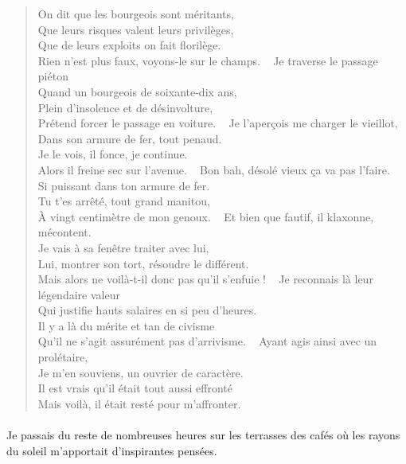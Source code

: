 \begin{verse}
On dit que les bourgeois sont méritants,\\
Que leurs risques valent leurs privilèges,\\
Que de leurs exploits on fait florilège.\\
Rien n’est plus faux, voyons-le sur le champs.
~
Je traverse le passage piéton\\
Quand un bourgeois de soixante-dix ans,\\
Plein d’insolence et de désinvolture,\\
Prétend forcer le passage en voiture.
~
Je l’aperçois me charger le vieillot,\\
Dans son armure de fer, tout penaud.\\
Je le vois, il fonce, je continue.\\
Alors il freine sec sur l’avenue.
~
Bon bah, désolé vieux ça va pas l’faire.\\
Si puissant dans ton armure de fer.\\
Tu t’es arrêté, tout grand manitou,\\
À vingt centimètre de mon genoux.
~
Et bien que fautif, il klaxonne, mécontent.\\
Je vais à sa fenêtre traiter avec lui,\\
Lui, montrer son tort, résoudre le différent.\\
Mais alors ne voilà-t-il donc pas qu’il s’enfuie !
~
Je reconnais là leur légendaire valeur\\
Qui justifie hauts salaires en si peu d’heures.\\
Il y a là du mérite et tan de civisme\\
Qu’il ne s’agit assurément pas d’arrivisme.
~
Ayant agis ainsi avec un prolétaire,\\
Je m’en souviens, un ouvrier de caractère.\\
Il est vrais qu’il était tout aussi effronté\\
Mais voilà, il était resté pour m’affronter.
\end{verse}

\paragraph{}
\begin{prose}
Je passais du reste de nombreuses heures sur les terrasses des cafés où les rayons du soleil m’apportait d’inspirantes pensées.
\end{prose}

